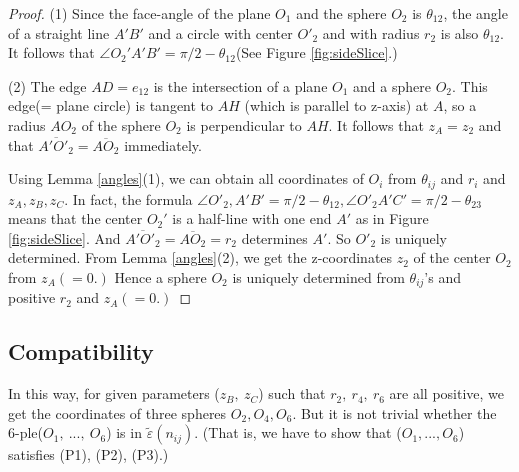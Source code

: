 \documentclass[suppldata, dvipdfmx]{interact}
\theoremstyle{plain}%
\theoremstyle{definition}
\theoremstyle{remark}
\theoremstyle{problemstyle}
\begin{document}
\begin{proof}
 (1) Since the face-angle of the plane $O_1$ and the sphere $O_2$ is
 $\theta_{12}$, the angle of a straight line $A'B'$ and a circle with
 center $O'_2$ and with radius $r_2$ is also $\theta_{12}$. It follows
 that $\angle O_2'A'B' = \pi/2 - \theta_{12}$(See Figure \ref{fig:sideSlice}.)
 
 (2) The edge $AD = e_{12}$ is the intersection of a plane $O_1$ and a
 sphere $O_2$. This edge(= plane circle) is tangent to $AH$ (which is
 parallel to z-axis) at $A$, so a radius $AO_2$ of the sphere $O_2$ is
 perpendicular to $AH$. It follows that $z_A=z_2$ and that
 $\overline{A'O'_2} = \overline{AO_2}$ immediately.

 Using Lemma \ref{angles}(1), we can obtain all coordinates of $O_i$ from
 $\theta_{ij}$ and $r_i$ and $z_A, z_B, z_C$. In fact, the formula
 $\angle O'_2, A'B' = \pi/2 - \theta_{12}, \angle O'_{2}A'C' = \pi/2 -
 \theta_{23}$ means that the center $O_2'$ is a half-line with one
 end $A'$ as in Figure \ref{fig:sideSlice}.
 And $\overline{A'O'_2} = \overline{AO_2} = r_2$ determines $A'$.
 So $O'_2$ is uniquely determined. From Lemma \ref{angles}(2), we get the
 z-coordinates $z_2$ of the center $O_2$ from $z_A(=0.)$ Hence a sphere
 $O_2$ is uniquely determined from $\theta_{ij}$'s and positive $r_2$
 and $z_A(= 0.)$
\end{proof}

\subsection{Compatibility}
In this way, for given parameters ($z_B,~z_C$) such that $r_2,~r_4,~r_6$
are all positive, we get the coordinates of three spheres 
$O_2, O_4, O_6$. But it is not trivial whether the 6-ple($O_1,~...,~O_6$) is
in $\tilde\varepsilon(n_{ij})$. (That is, we have to show that 
($O_1,..., O_6$) satisfies (P1), (P2), (P3).)
\end{document}

